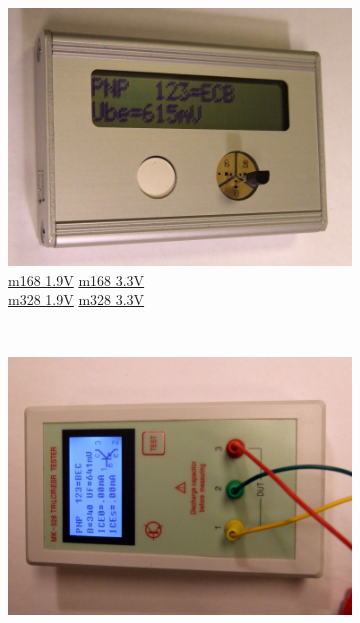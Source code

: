 \documentclass[pdftex,12pt,a4paper,english]{article}
\begin{document}
\begin{figure}[H]
  \begin{subfigure}[b]{.3\textwidth}
    \centering
    \includegraphics[width=1.\textwidth]{../PNG/Fifi_total.JPG}
	  \\ \vspace{-1.em}
	  {\href{run:./trunk/mega168_1.9V/}{m168 1.9V}} \hspace{10pt}
	  {\href{run:./trunk/mega168_3.3V/}{m168 3.3V}} \\
	  {\href{run:./trunk/mega328_1.9V/}{m328 1.9V}} \hspace{10pt}
	  {\href{run:./trunk/mega328_3.3V/}{m328 3.3V}}
  \end{subfigure}
~
  \begin{subfigure}[b]{.3\textwidth}
    \centering
    \includegraphics[width=1.\textwidth]{../PNG/MK328_total.JPG}

\end{subfigure}
\end{figure}
\end{document}
